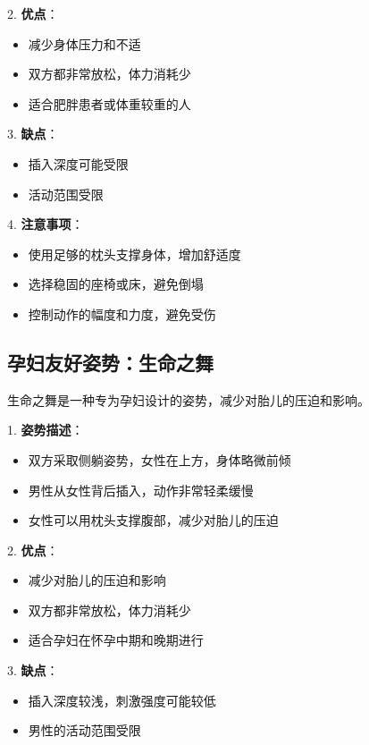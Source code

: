 \documentclass[12pt,UTF8]{ctexbook}
\begin{document}
2. \textbf{优点}：
  \begin{itemize}
  \item 减少身体压力和不适
  \item 双方都非常放松，体力消耗少
  \item 适合肥胖患者或体重较重的人
  \end{itemize}

3. \textbf{缺点}：
  \begin{itemize}
  \item 插入深度可能受限
  \item 活动范围受限
  \end{itemize}

4. \textbf{注意事项}：
  \begin{itemize}
  \item 使用足够的枕头支撑身体，增加舒适度
  \item 选择稳固的座椅或床，避免倒塌
  \item 控制动作的幅度和力度，避免受伤
  \end{itemize}

\subsection{孕妇友好姿势：生命之舞}

生命之舞是一种专为孕妇设计的姿势，减少对胎儿的压迫和影响。

1. \textbf{姿势描述}：
  \begin{itemize}
  \item 双方采取侧躺姿势，女性在上方，身体略微前倾
  \item 男性从女性背后插入，动作非常轻柔缓慢
  \item 女性可以用枕头支撑腹部，减少对胎儿的压迫
  \end{itemize}

2. \textbf{优点}：
  \begin{itemize}
  \item 减少对胎儿的压迫和影响
  \item 双方都非常放松，体力消耗少
  \item 适合孕妇在怀孕中期和晚期进行
  \end{itemize}

3. \textbf{缺点}：
  \begin{itemize}
  \item 插入深度较浅，刺激强度可能较低
  \item 男性的活动范围受限
  \end{itemize}
\end{document}
